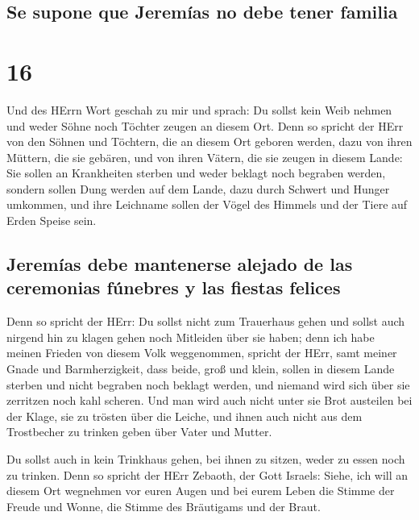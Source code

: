 \hypertarget{se-supone-que-jeremuxedas-no-debe-tener-familia}{%
\subsection{Se supone que Jeremías no debe tener
familia}\label{se-supone-que-jeremuxedas-no-debe-tener-familia}}

\hypertarget{section-15}{%
\section{16}\label{section-15}}

 Und des HErrn Wort geschah zu mir und sprach:
 Du sollst kein Weib nehmen und weder Söhne noch Töchter
zeugen an diesem Ort.  Denn so spricht der HErr von den
Söhnen und Töchtern, die an diesem Ort geboren werden, dazu von ihren
Müttern, die sie gebären, und von ihren Vätern, die sie zeugen in diesem
Lande:  Sie sollen an Krankheiten sterben und weder
beklagt noch begraben werden, sondern sollen Dung werden auf dem Lande,
dazu durch Schwert und Hunger umkommen, und ihre Leichname sollen der
Vögel des Himmels und der Tiere auf Erden Speise sein.

\hypertarget{jeremuxedas-debe-mantenerse-alejado-de-las-ceremonias-fuxfanebres-y-las-fiestas-felices}{%
\subsection{Jeremías debe mantenerse alejado de las ceremonias fúnebres
y las fiestas
felices}\label{jeremuxedas-debe-mantenerse-alejado-de-las-ceremonias-fuxfanebres-y-las-fiestas-felices}}

 Denn so spricht der HErr: Du sollst nicht zum Trauerhaus
gehen und sollst auch nirgend hin zu klagen gehen noch Mitleiden über
sie haben; denn ich habe meinen Frieden von diesem Volk weggenommen,
spricht der HErr, samt meiner Gnade und Barmherzigkeit, 
dass beide, groß und klein, sollen in diesem Lande sterben und nicht
begraben noch beklagt werden, und niemand wird sich über sie zerritzen
noch kahl scheren.  Und man wird auch nicht unter sie Brot
austeilen bei der Klage, sie zu trösten über die Leiche, und ihnen auch
nicht aus dem Trostbecher zu trinken geben über Vater und Mutter.

 Du sollst auch in kein Trinkhaus gehen, bei ihnen zu
sitzen, weder zu essen noch zu trinken.  Denn so spricht
der HErr Zebaoth, der Gott Israels: Siehe, ich will an diesem Ort
wegnehmen vor euren Augen und bei eurem Leben die Stimme der Freude und
Wonne, die Stimme des Bräutigams und der Braut.

